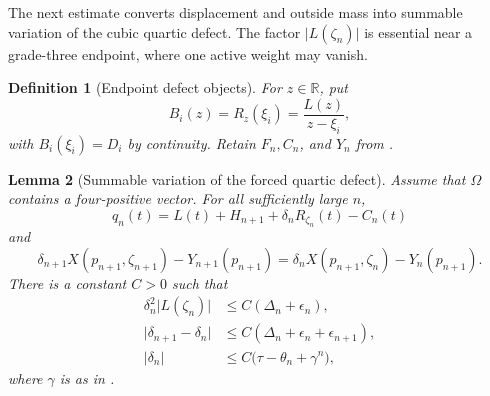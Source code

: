 \documentclass[11pt]{article}
\newtheorem{lemma}{Lemma}[section]
\newtheorem{definition}[lemma]{Definition}
\begin{document}
The next estimate converts displacement and outside mass into summable
variation of the cubic quartic defect.  The factor
\(\lvert L(\zeta_n)\rvert\) is essential near a grade-three endpoint, where
one active weight may vanish.

\begin{definition}[Endpoint defect objects]
\label{def:forced-objects}
For \(z\in\mathbb R\), put
\[
 B_i(z)=R_z(\xi_i)=\frac{L(z)}{z-\xi_i},
\]
with \(B_i(\xi_i)=D_i\) by continuity.  Retain \(F_n,C_n\), and
\(Y_n\) from .
\end{definition}

\begin{lemma}[Summable variation of the forced quartic defect]
\label{lem:defect-tail}
Assume that \(\Omega\) contains a four-positive vector.  For all
sufficiently large \(n\),
\[
 q_n(t)=L(t)+H_{n+1}+\delta_nR_{\zeta_n}(t)-C_n(t)
\tag{37}\label{eq:forced-quartic}
\]
and
\[
 \delta_{n+1}X(p_{n+1},\zeta_{n+1})-Y_{n+1}(p_{n+1})
 =
 \delta_nX(p_{n+1},\zeta_n)-Y_n(p_{n+1}).
\tag{38}\label{eq:forced-transport-local}
\]
There is a constant \(C>0\) such that
\begin{align}
 \delta_n^2\lvert L(\zeta_n)\rvert
 &\leq C(\Delta_n+\epsilon_n),
 \tag{39}
 \label{eq:defect-energy}\\
 \lvert\delta_{n+1}-\delta_n\rvert
 &\leq C(\Delta_n+\epsilon_n+\epsilon_{n+1}),
 \tag{40}
 \label{eq:defect-variation}\\
 \lvert\delta_n\rvert
 &\leq C\bigl(\tau-\theta_n+\gamma^n\bigr),
 \tag{41}
 \label{eq:defect-tail}
\end{align}
where \(\gamma\) is as in .
\end{lemma}
\end{document}
